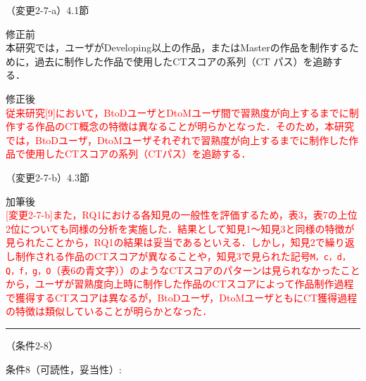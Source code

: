 \documentclass{jarticle} %
\def\subsection#1{ \vspace{1pc} {\gt #1} }
\def\nextans{ \vspace{2pc} \hrule }
\begin{document}
\subsection{（変更2-7-a）4.1節}
\vspace{-0.3cm}
\begin{description}
\item 修正前\\
\phantom{　}
本研究では，ユーザがDeveloping以上の作品，またはMasterの作品を制作するために，過去に制作した作品で使用したCTスコアの系列（CT パス）を追跡する．
\vspace{-0.3cm}
\item 修正後\\
\phantom{　}
\textcolor{red}{
従来研究[9]において，BtoDユーザとDtoMユーザ間で習熟度が向上するまでに制作する作品のCT概念の特徴は異なることが明らかとなった．そのため，本研究では，BtoDユーザ，DtoMユーザそれぞれで習熟度が向上するまでに制作した作品で使用したCTスコアの系列（CTパス）を追跡する．
}
\end{description}

\subsection{（変更2-7-b）4.3節}
\vspace{-0.3cm}
\begin{description}
\item 加筆後\\
\phantom{　}
\textcolor{red}{[変更2-7-b]また，RQ1における各知見の一般性を評価するため，表3，表7の上位2位についても同様の分析を実施した．結果として知見1〜知見3と同様の特徴が見られたことから，RQ1の結果は妥当であるといえる．しかし，知見2で繰り返し制作される作品のCTスコアが異なることや，知見3で見られた記号\texttt{\large{M，c，d，Q，f，g，O}}（表6の青文字））のようなCTスコアのパターンは見られなかったことから，ユーザが習熟度向上時に制作した作品のCTスコアによって作品制作過程で獲得するCTスコアは異なるが，BtoDユーザ，DtoMユーザともにCT獲得過程の特徴は類似していることが明らかとなった．}
\end{description}




\newpage
\nextans
\subsection{（条件2-8）}

条件8（可読性，妥当性）:
\end{document}
